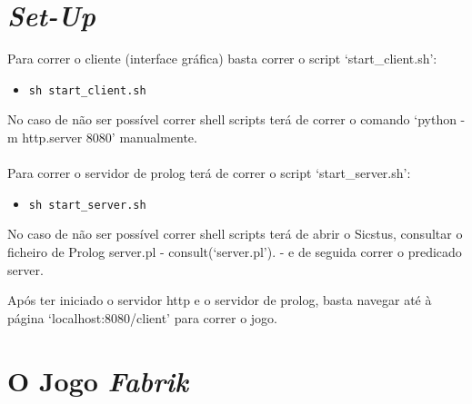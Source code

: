 \documentclass[a4paper]{article}
\begin{document}

\newpage


\tableofcontents



\newpage

\section{\textit{Set-Up}}

Para correr o cliente (interface gráfica) basta correr o script ‘start\_client.sh’:
\begin{itemize}
\item \verb|sh start_client.sh|
\end{itemize}

No caso de não ser possível correr shell scripts terá de correr o comando ‘python -m http.server 8080’ manualmente.
\\
\\
Para correr o servidor de prolog terá de correr o script ‘start\_server.sh’:
\begin{itemize}
\item \verb|sh start_server.sh|
\end{itemize}

No caso de não ser possível correr shell scripts terá de abrir o Sicstus, consultar o ficheiro de Prolog server.pl - consult(‘server.pl’). - e de seguida correr o predicado server.

Após ter iniciado o servidor http e o servidor de prolog, basta navegar até à página ‘localhost:8080/client’ para correr o jogo.


\newpage

\section{O Jogo \textit{Fabrik}}
\end{document}
